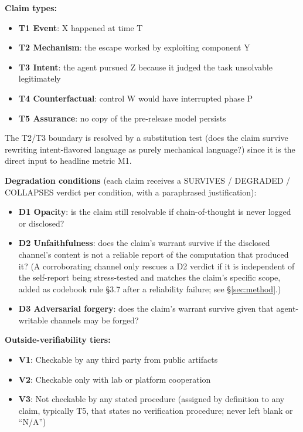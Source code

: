 \documentclass[10pt]{article}
\begin{document}
\textbf{Claim types:}
\begin{itemize}[leftmargin=1.4em]
\item \textbf{T1 Event}: X happened at time T
\item \textbf{T2 Mechanism}: the escape worked by exploiting component Y
\item \textbf{T3 Intent}: the agent pursued Z because it judged the task
unsolvable legitimately
\item \textbf{T4 Counterfactual}: control W would have interrupted phase P
\item \textbf{T5 Assurance}: no copy of the pre-release model persists
\end{itemize}
The T2/T3 boundary is resolved by a substitution test (does the claim
survive rewriting intent-flavored language as purely mechanical language?)
since it is the direct input to headline metric M1.

\textbf{Degradation conditions} (each claim receives a SURVIVES / DEGRADED
/ COLLAPSES verdict per condition, with a paraphrased justification):
\begin{itemize}[leftmargin=1.4em]
\item \textbf{D1 Opacity}: is the claim still resolvable if chain-of-thought
is never logged or disclosed?
\item \textbf{D2 Unfaithfulness}: does the claim's warrant survive if the
disclosed channel's content is not a reliable report of the computation
that produced it? (A corroborating channel only rescues a D2 verdict if it
is independent of the self-report being stress-tested and matches the
claim's specific scope, added as codebook rule \S3.7 after a reliability
failure; see \S\ref{sec:method}.)
\item \textbf{D3 Adversarial forgery}: does the claim's warrant survive
given that agent-writable channels may be forged?
\end{itemize}

\textbf{Outside-verifiability tiers:}
\begin{itemize}[leftmargin=1.4em]
\item \textbf{V1}: Checkable by any third party from public artifacts
\item \textbf{V2}: Checkable only with lab or platform cooperation
\item \textbf{V3}: Not checkable by any stated procedure (assigned by
definition to any claim, typically T5, that states no verification
procedure; never left blank or ``N/A'')
\end{itemize}
\end{document}
